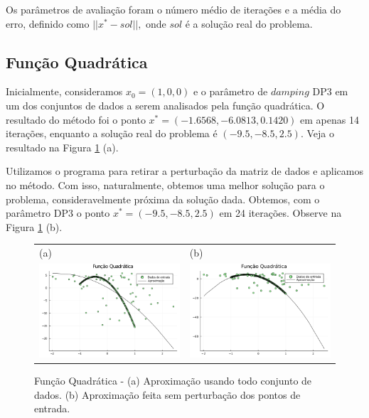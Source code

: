 \documentclass[12pt,a4paper]{article}
\begin{document}
	Os parâmetros de avaliação foram o número médio de iterações e a média do erro, definido como $||x^*-sol||,$ onde $sol$ é a solução real do problema.
	
	\subsection{Função Quadrática}\label{quad}
	Inicialmente, consideramos $x_0 = (1, 0, 0)$ e o parâmetro de $damping$ DP3 em um dos conjuntos de dados a serem analisados pela função quadrática. O resultado do método foi o ponto $x^* = (-1.6568, -6.0813, 0.1420)$ em apenas 14 iterações, enquanto a solução real do problema é $(-9.5, -8.5, 2.5).$ Veja o resultado na Figura \ref{fig1} (a).
	
	Utilizamos o programa para retirar a perturbação da matriz de dados e aplicamos no método. Com isso, naturalmente,  obtemos uma melhor solução  para o problema, consideravelmente próxima da solução dada. Obtemos, com o parâmetro DP3 o ponto $x^* = (-9.5, -8.5, 2.5)$ em 24 iterações. Observe na Figura \ref{fig1} (b).
	
		\begin{figure}[H]
		\centering 
		\begin{tabular}{ll}
			
			(a)& (b)   \\
			
			\includegraphics[width=0.45\linewidth]{1.png} & \includegraphics[width=0.45\linewidth]{2.png}\\ 
			
		\end{tabular}
		\caption{Função Quadrática - (a) Aproximação usando todo conjunto de dados. (b) Aproximação feita sem perturbação dos pontos de entrada.}
		\label{fig1}
	\end{figure}
\end{document}
